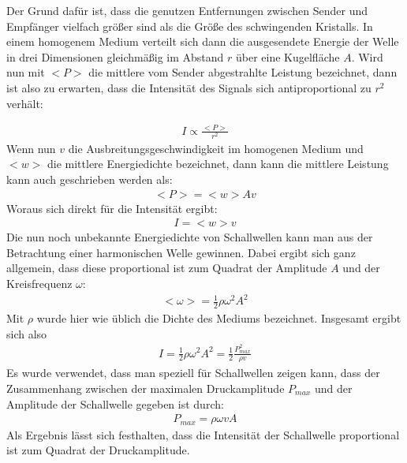 \documentclass[12pt,a4paper,titlepage,headinclude,bibtotoc]{scrartcl}
\begin{document}

Der Grund dafür ist, dass die genutzen Entfernungen zwischen Sender und Empfänger vielfach größer sind als die Größe des schwingenden Kristalls. 
In einem homogenem Medium verteilt sich dann die ausgesendete Energie der Welle in drei Dimensionen gleichmäßig im Abstand $r$ über eine Kugelfläche $A$. Wird nun mit $<P>$ die mittlere vom Sender abgestrahlte Leistung 
bezeichnet, dann ist also zu erwarten, dass die Intensität des Signals sich antiproportional zu $r^2$ verhält:

\begin{align}
 I \propto \frac{<P>}{r^2}
\end{align}
Wenn nun $v$ die Ausbreitungsgeschwindigkeit im homogenen Medium und $<w>$ die mittlere Energiedichte bezeichnet, dann kann die mittlere Leistung kann auch geschrieben werden als:
\begin{align}
 <P>  = <w> A v
\end{align}
Woraus sich direkt für die Intensität ergibt:
\begin{align}
 I = <w> v
\end{align}
Die nun noch unbekannte Energiedichte von Schallwellen kann man aus der Betrachtung einer harmonischen Welle gewinnen. Dabei ergibt sich ganz allgemein, dass diese 
proportional ist zum Quadrat der Amplitude $A$ und der Kreisfrequenz $\omega$:
\begin{align}
 <\omega> = \frac{1}{2} \rho \omega^2 A^2
\end{align}
Mit $\rho$ wurde hier wie üblich die Dichte des Mediums bezeichnet.
Insgesamt ergibt sich also 
\begin{align}
 I = \frac{1}{2} \rho \omega^2 A^2 = \frac{1}{2} \frac{P_{max}^2}{\rho v}  
\end{align}
Es wurde verwendet, dass man speziell für Schallwellen zeigen kann, dass der Zusammenhang zwischen der maximalen Druckamplitude $P_{max}$ und der Amplitude der Schallwelle gegeben ist durch:
\begin{align}
 P_{max} = \rho \omega v A
\end{align}
Als Ergebnis lässt sich festhalten, dass die Intensität der Schallwelle proportional ist zum Quadrat der Druckamplitude.
\end{document}
